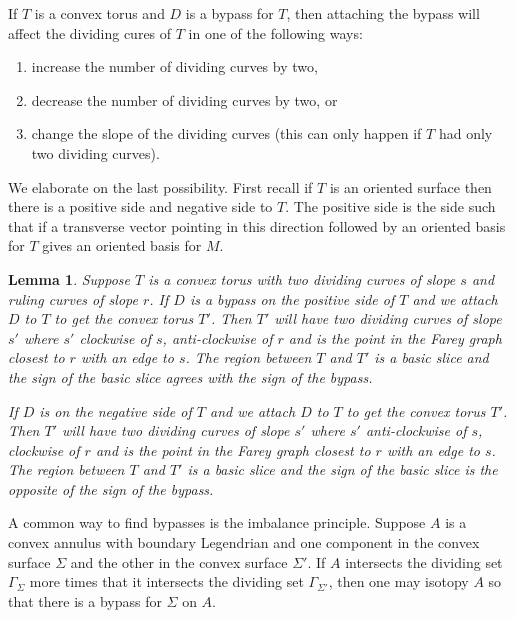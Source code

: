 \documentclass[11pt]{amsart}
\theoremstyle{plain}
\newtheorem{lemma}[theorem]{Lemma}
\theoremstyle{definition}
\theoremstyle{remark}
\numberwithin{theorem}{section}
\begin{document}
If $T$ is a convex torus and $D$ is a bypass for $T$, then attaching the bypass will affect the dividing cures of $T$ in one of the following ways:
\begin{enumerate}
\item increase the number of dividing curves by two,
\item decrease the number of dividing curves by two, or
\item change the slope of the dividing curves (this can only happen if $T$ had only two dividing curves). 
\end{enumerate}
We elaborate on the last possibility. First recall if $T$ is an oriented surface then there is a positive side and negative side to $T$. The positive side is the side such that if a transverse vector pointing in this direction followed by an oriented basis for $T$ gives an oriented basis for $M$. 
\begin{lemma}
Suppose $T$ is a convex torus with two dividing curves of slope $s$ and ruling curves of slope $r$. If $D$ is a bypass on the positive side of $T$ and we attach $D$ to $T$ to get the convex torus $T'$. Then $T'$ will have two dividing curves of slope $s'$ where $s'$ clockwise of $s$, anti-clockwise of $r$ and is the point in the Farey graph closest to $r$ with an edge to $s$. The region between $T$ and $T'$ is a basic slice and the sign of the basic slice agrees with the sign of the bypass. 

If $D$ is on the negative side of $T$ and we attach $D$ to $T$ to get the convex torus $T'$. Then $T'$ will have two dividing curves of slope $s'$ where $s'$ anti-clockwise of $s$, clockwise of $r$ and is the point in the Farey graph closest to $r$ with an edge to $s$. The region between $T$ and $T'$ is a basic slice and the sign of the basic slice is the opposite of the sign of the bypass. 
\end{lemma}

A common way to find bypasses is the imbalance principle. Suppose $A$ is a convex annulus with boundary Legendrian and one component in the convex surface $\Sigma$ and the other in the convex surface $\Sigma'$. If $A$ intersects the dividing set $\Gamma_\Sigma$ more times that it intersects the dividing set $\Gamma_{\Sigma'}$, then one may isotopy $A$ so that there is a bypass for $\Sigma$ on $A$. 

   
\end{document}
